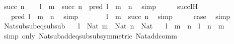 \begin{isabellebody}
\ {\isacharparenleft}{\kern0pt}succ\ n{\isacharparenright}{\kern0pt}\isanewline
\ \ \isamarkupfalse%
\ {\isachardoublequoteopen}l\ {\isacharminus}{\kern0pt}\ {\isacharparenleft}{\kern0pt}m\ {\isacharplus}{\kern0pt}\ succ\ n{\isacharparenright}{\kern0pt}\ {\isacharequal}{\kern0pt}\ pred\ {\isacharparenleft}{\kern0pt}l\ {\isacharminus}{\kern0pt}\ {\isacharparenleft}{\kern0pt}m\ {\isacharplus}{\kern0pt}\ n{\isacharparenright}{\kern0pt}{\isacharparenright}{\kern0pt}{\isachardoublequoteclose}\ \isamarkupfalse%
\ simp\isanewline
\ \ \isamarkupfalse%
\ \isamarkupfalse%
\ succ{\isachardot}{\kern0pt}IH\ \isamarkupfalse%
\ {\isachardoublequoteopen}{\isachardot}{\kern0pt}{\isachardot}{\kern0pt}{\isachardot}{\kern0pt}\ {\isacharequal}{\kern0pt}\ pred\ {\isacharparenleft}{\kern0pt}l\ {\isacharminus}{\kern0pt}\ m\ {\isacharminus}{\kern0pt}\ n{\isacharparenright}{\kern0pt}{\isachardoublequoteclose}\ \isamarkupfalse%
\ simp\isanewline
\ \ \isamarkupfalse%
\ \isamarkupfalse%
\ {\isachardoublequoteopen}{\isachardot}{\kern0pt}{\isachardot}{\kern0pt}{\isachardot}{\kern0pt}\ {\isacharequal}{\kern0pt}\ l\ {\isacharminus}{\kern0pt}\ m\ {\isacharminus}{\kern0pt}\ succ\ n{\isachardoublequoteclose}\ \isamarkupfalse%
\ simp\isanewline
\ \ \isamarkupfalse%
\ \isamarkupfalse%
\ {\isacharquery}{\kern0pt}case\ \isacommand{{\isachardot}{\kern0pt}}\isamarkupfalse%
\isanewline
{}\isamarkupfalse%
\ simp%
\endisatagproof
{\isafoldproof}%
%
\isadelimproof
\isanewline
%
\endisadelimproof
\isanewline
{}\isamarkupfalse%
\ Nat{\isacharunderscore}{\kern0pt}sub{\isacharunderscore}{\kern0pt}sub{\isacharunderscore}{\kern0pt}eq{\isacharunderscore}{\kern0pt}sub{\isacharunderscore}{\kern0pt}sub{\isacharcolon}{\kern0pt}\isanewline
\ \ \ {\isachardoublequoteopen}l\ {\isacharcolon}{\kern0pt}\ Nat{\isachardoublequoteclose}\ {\isachardoublequoteopen}m\ {\isacharcolon}{\kern0pt}\ Nat{\isachardoublequoteclose}\ {\isachardoublequoteopen}n\ {\isacharcolon}{\kern0pt}\ Nat{\isachardoublequoteclose}\isanewline
\ \ \ {\isachardoublequoteopen}l\ {\isacharminus}{\kern0pt}\ m\ {\isacharminus}{\kern0pt}\ n\ {\isacharequal}{\kern0pt}\ l\ {\isacharminus}{\kern0pt}\ n\ {\isacharminus}{\kern0pt}\ m{\isachardoublequoteclose}\isanewline
%
\isadelimproof
\ \ %
\endisadelimproof
%
\isatagproof
{}\isamarkupfalse%
\ {\isacharparenleft}{\kern0pt}simp\ only{\isacharcolon}{\kern0pt}\ Nat{\isacharunderscore}{\kern0pt}sub{\isacharunderscore}{\kern0pt}add{\isacharunderscore}{\kern0pt}eq{\isacharunderscore}{\kern0pt}sub{\isacharunderscore}{\kern0pt}sub{\isacharbrackleft}{\kern0pt}symmetric{\isacharbrackright}{\kern0pt}\ Nat{\isacharunderscore}{\kern0pt}add{\isacharunderscore}{\kern0pt}comm{\isacharparenright}{\kern0pt}%
\endisatagproof
{\isafoldproof}%
%
\isadelimproof
\isanewline
%
\endisadelimproof
\isanewline
%
\isadelimtheory
\isanewline
%
\endisadelimtheory
%
\isatagtheory
{}\isamarkupfalse%
%
\endisatagtheory
{\isafoldtheory}%
%
\isadelimtheory
%
\endisadelimtheory
%
\end{isabellebody}%
